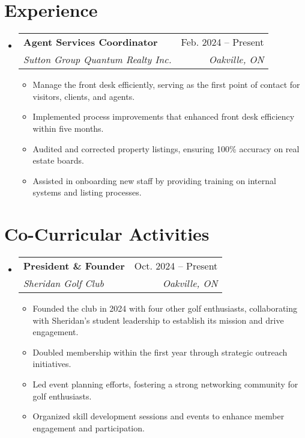 \documentclass[letterpaper,11pt]{article}
\makeatletter
\newcommand{\resumeItem}[1]{
  \item\small{
    {#1 \vspace{-2pt}}
  }
}
\newcommand{\resumeSubheading}[4]{
  \vspace{-2pt}\item
    \begin{tabular*}{0.97\textwidth}[t]{l@{\extracolsep{\fill}}r}
      \textbf{#1} & #2 \\
      \textit{\small#3} & \textit{\small #4} \\
    \end{tabular*}\vspace{-7pt}
}
\newcommand{\resumeSubHeadingListStart}{\begin{itemize}[leftmargin=0.15in, label={}]}
\newcommand{\resumeSubHeadingListEnd}{\end{itemize}}
\newcommand{\resumeItemListStart}{\begin{itemize}}
\newcommand{\resumeItemListEnd}{\end{itemize}\vspace{-5pt}}
\makeatother
\begin{document}

\section{Experience}
\resumeSubHeadingListStart

    \resumeSubheading
        { Agent Services Coordinator }
        { Feb. 2024 -- Present }
        { Sutton Group Quantum Realty Inc. }
        { Oakville, ON }
    \resumeItemListStart
        
            \resumeItem{ Manage the front desk efficiently, serving as the first point of contact for visitors, clients, and agents. }
        
            \resumeItem{ Implemented process improvements that enhanced front desk efficiency within five months. }
        
            \resumeItem{ Audited and corrected property listings, ensuring 100\% accuracy on real estate boards. }
        
            \resumeItem{ Assisted in onboarding new staff by providing training on internal systems and listing processes. }
        
    \resumeItemListEnd

\resumeSubHeadingListEnd



\section{Co-Curricular Activities}
\resumeSubHeadingListStart

    \resumeSubheading
        { President \& Founder }
        { Oct. 2024 -- Present }
        { Sheridan Golf Club }
        { Oakville, ON }
    \resumeItemListStart
        
            \resumeItem{ Founded the club in 2024 with four other golf enthusiasts, collaborating with Sheridan’s student leadership to establish its mission and drive engagement. }
        
            \resumeItem{ Doubled membership within the first year through strategic outreach initiatives. }
        
            \resumeItem{ Led event planning efforts, fostering a strong networking community for golf enthusiasts. }
        
            \resumeItem{ Organized skill development sessions and events to enhance member engagement and participation. }
        
    \resumeItemListEnd

\resumeSubHeadingListEnd
\end{document}
